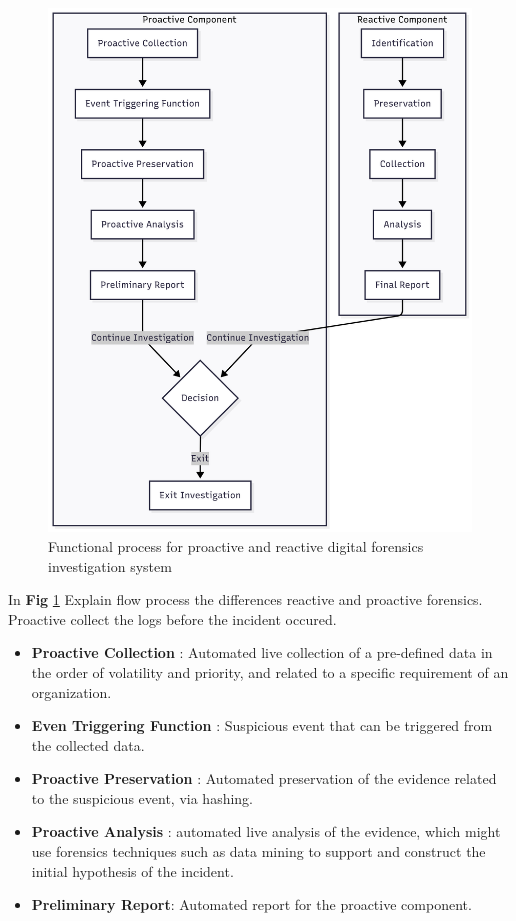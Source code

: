 \begin{figure}[H] 
    \centering
    \includegraphics[width=14cm]{figure/proactive-reactive-flow-process.jpg}
    \caption{Functional process for proactive and reactive digital forensics investigation system \cite{proactiveandreactivedigitalforensics}}
    \label{fig:flow-pro-react}
\end{figure}

In \textbf{Fig} \ref{fig:flow-pro-react} Explain flow process the differences reactive and proactive forensics. Proactive collect the logs before the incident occured.

\begin{itemize}
    \item \textbf{Proactive Collection} : Automated live collection of a pre-defined data in the order
of volatility and priority, and related to a specific requirement of an organization.
    \item \textbf{Even Triggering Function} : Suspicious event that can be triggered from the
collected data.
    \item \textbf{Proactive Preservation} : Automated preservation of the evidence related to the
suspicious event, via hashing.
    \item \textbf{Proactive Analysis} : automated live analysis of the evidence, which might use
forensics techniques such as data mining to support and construct the initial
hypothesis of the incident.
    \item \textbf{Preliminary Report}: Automated report for the proactive component. 
\end{itemize}

